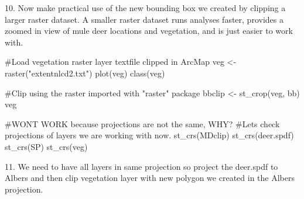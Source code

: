 \documentclass[
  letterpaper,
]{book}
\newenvironment{Shaded}{\begin{snugshade}}{\end{snugshade}}
\newcommand{\CommentTok}[1]{\textcolor[rgb]{0.37,0.37,0.37}{#1}}
\newcommand{\FunctionTok}[1]{\textcolor[rgb]{0.28,0.35,0.67}{#1}}
\newcommand{\NormalTok}[1]{\textcolor[rgb]{0.00,0.23,0.31}{#1}}
\newcommand{\OtherTok}[1]{\textcolor[rgb]{0.00,0.23,0.31}{#1}}
\newcommand{\StringTok}[1]{\textcolor[rgb]{0.13,0.47,0.30}{#1}}
\begin{document}
10. Now make practical use of the new bounding box we created by
clipping a larger raster dataset. A smaller raster dataset runs analyses
faster, provides a zoomed in view of mule deer locations and vegetation,
and is just easier to work with.

\begin{Shaded}
\begin{Highlighting}[]
\CommentTok{\#Load vegetation raster layer textfile clipped in ArcMap }
\NormalTok{veg }\OtherTok{\textless{}{-}}\FunctionTok{raster}\NormalTok{(}\StringTok{"extentnlcd2.txt"}\NormalTok{)}
\FunctionTok{plot}\NormalTok{(veg)}
\FunctionTok{class}\NormalTok{(veg)}
\end{Highlighting}
\end{Shaded}

\begin{Shaded}
\begin{Highlighting}[]
\CommentTok{\#Clip using the raster imported with "raster" package}
\NormalTok{bbclip }\OtherTok{\textless{}{-}} \FunctionTok{st\_crop}\NormalTok{(veg, bb)}
\NormalTok{veg}
\end{Highlighting}
\end{Shaded}

\begin{Shaded}
\begin{Highlighting}[]
\CommentTok{\#WON\textquotesingle{}T WORK because projections are not the same, WHY?}
\CommentTok{\#Let\textquotesingle{}s check projections of layers we are working with now.}
\FunctionTok{st\_crs}\NormalTok{(MDclip)}
\FunctionTok{st\_crs}\NormalTok{(deer.spdf)}
\FunctionTok{st\_crs}\NormalTok{(SP)}
\FunctionTok{st\_crs}\NormalTok{(veg)}
\end{Highlighting}
\end{Shaded}

11. We need to have all layers in same projection so project the
deer.spdf to Albers and then clip vegetation layer with new polygon we
created in the Albers projection.
\end{document}

